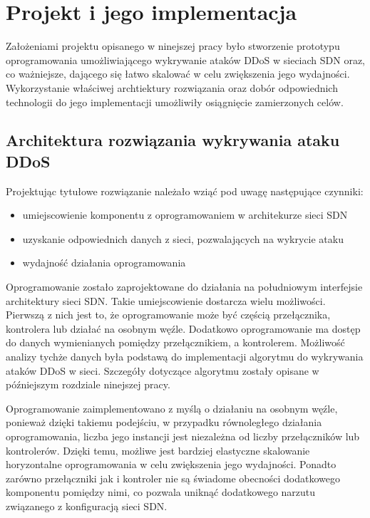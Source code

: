\chapter{Projekt i jego implementacja}

Założeniami projektu opisanego w ninejszej pracy było stworzenie prototypu
oprogramowania umożliwiającego wykrywanie ataków DDoS w sieciach SDN oraz, co
ważniejsze, dającego się łatwo skalować w celu zwiększenia jego wydajności.
Wykorzystanie właściwej archtiektury rozwiązania oraz dobór odpowiednich
technologii do jego implementacji umożliwiły osiągnięcie zamierzonych celów.

\section{Architektura rozwiązania wykrywania ataku DDoS}

Projektując tytułowe rozwiązanie należało wziąć pod uwagę następujące czynniki:
\begin{itemize}
  \item umiejscowienie komponentu z oprogramowaniem w architekurze sieci SDN
  \item uzyskanie odpowiednich danych z sieci, pozwalających na wykrycie ataku
  \item wydajność działania oprogramowania
\end{itemize}

Oprogramowanie zostało zaprojektowane do działania na południowym interfejsie
architektury sieci SDN. Takie umiejscowienie dostarcza wielu możliwości.
Pierwszą z nich jest to, że oprogramowanie może być częścią przełącznika,
kontrolera lub działać na osobnym węźle. Dodatkowo oprogramowanie ma dostęp do
danych wymienianych pomiędzy przełącznikiem, a kontrolerem. Możliwość analizy
tychże danych była podstawą do implementacji algorytmu do wykrywania ataków DDoS
w sieci. Szczegóły dotyczące algorytmu zostały opisane w późniejszym rozdziale
ninejszej pracy. 

Oprogramowanie zaimplementowano z myślą o działaniu na osobnym węźle,
ponieważ dzięki takiemu podejściu, w przypadku równoległego działania
oprogramowania, liczba jego instancji jest niezależna od liczby przełączników
lub kontrolerów. Dzięki temu, możliwe jest bardziej elastyczne skalowanie
horyzontalne oprogramowania w celu zwiększenia jego wydajności. Ponadto zarówno
przełączniki jak i kontroler nie są świadome obecności dodatkowego komponentu
pomiędzy nimi, co pozwala uniknąć dodatkowego narzutu związanego z konfiguracją
sieci SDN. 

